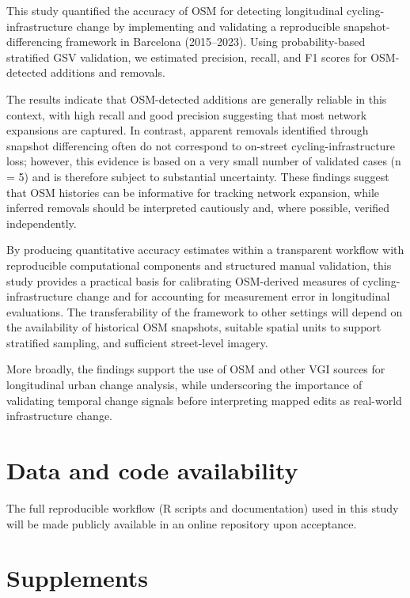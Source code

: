 \documentclass[
]{article}
\begin{document}
This study quantified the accuracy of OSM for detecting longitudinal
cycling-infrastructure change by implementing and validating a
reproducible snapshot-differencing framework in Barcelona (2015--2023).
Using probability-based stratified GSV validation, we estimated
precision, recall, and F1 scores for OSM-detected additions and
removals.

The results indicate that OSM-detected additions are generally reliable
\color{black}in this context, with high recall and good precision
suggesting that most network expansions are captured. In contrast,
apparent removals identified through snapshot differencing often do not
correspond to on-street cycling-infrastructure loss; however, this
evidence is based on a very small number of validated cases (n = 5) and
is therefore subject to substantial uncertainty. These findings suggest
that OSM histories can be informative for tracking network expansion,
while inferred removals should be interpreted cautiously and, where
possible, verified independently.\color{black}

By producing quantitative accuracy estimates within a transparent
\color{black}workflow with reproducible computational components and
structured manual validation\color{black}, this study provides a
practical basis for calibrating OSM-derived measures of
cycling-infrastructure change and for accounting for measurement error
in longitudinal evaluations. \color{black}The transferability of the
framework to other settings will depend on the availability of
historical OSM snapshots, suitable spatial units to support stratified
sampling, and sufficient street-level imagery.\color{black}

More broadly, the findings support the use of OSM and other VGI sources
for longitudinal urban change analysis, while underscoring the
importance of validating temporal change signals before interpreting
mapped edits as real-world infrastructure change.

\section*{Data and code availability}\label{data-and-code-availability}

The full reproducible workflow (R scripts and documentation) used in
this study will be made publicly available in an online repository upon
acceptance.

\section*{Supplements}\label{supplements}
\end{document}
